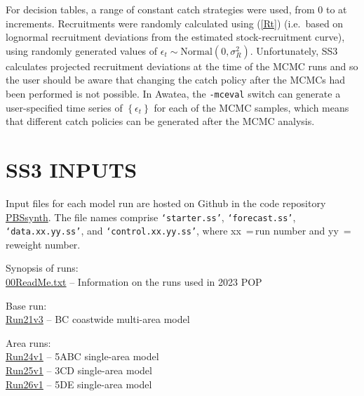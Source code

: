 \documentclass[11pt]{book}
\newcommand{\code}[1]{\normalsize\texttt{#1}\normalsize}%
\def\hsd{\hspace*{1ex}}
\def\tab{\hsd\hsd}
\newcommand{\eref}[1]{(\ref{#1})}
\begin{document}
For decision tables, a range of constant catch strategies were used, from 0 to \policyMax{} at \policyInc{} increments.
Recruitments were randomly calculated using \eref{Rt} (i.e.~based on lognormal recruitment deviations from the estimated stock-recruitment curve), using randomly generated values of $\epsilon_t \sim \mbox{Normal}(0, \sigma_R^2)$. 
Unfortunately, SS3 calculates projected recruitment deviations at the time of the MCMC runs and so the user should be aware that changing the catch policy after the MCMCs had been performed is not possible.
In Awatea, the \code{-mceval} switch can generate a user-specified time series of $\left\{ \epsilon_t \right\}$ for each of the MCMC samples, which means that different catch policies can be generated after the MCMC analysis.

\section{SS3 INPUTS} \label{s:inputs}

Input files for each model run are hosted on Github in the code repository \href{https://github.com/pbs-software/pbs-synth}{PBSsynth}.
The file names comprise \code{`starter.ss'}, \code{`forecast.ss'}, \code{`data.xx.yy.ss'}, and \code{`control.xx.yy.ss'}, where xx~=\,run number and yy~=\,reweight number. 

Synopsis of runs:\\
\tab \href{https://github.com/pbs-software/pbs-synth/tree/master/PBSsynth/inst/input/2023/POP/00ReadMe.txt}{00ReadMe.txt} -- Information on the runs used in 2023 POP

Base run:\\
\tab \href{https://github.com/pbs-software/pbs-synth/tree/master/PBSsynth/inst/input/2023/POP/CST/Base/R21v3/21.01}{Run21v3} -- BC coastwide multi-area model

Area runs:\\
\tab \href{https://github.com/pbs-software/pbs-synth/tree/master/PBSsynth/inst/input/2023/POP/5ABC/R24v1/24.01}{Run24v1} -- 5ABC single-area model\\
\tab \href{https://github.com/pbs-software/pbs-synth/tree/master/PBSsynth/inst/input/2023/POP/3CD/R25v1/25.01}{Run25v1} -- 3CD single-area model\\
\tab \href{https://github.com/pbs-software/pbs-synth/tree/master/PBSsynth/inst/input/2023/POP/5DE/R26v1/26.01}{Run26v1} -- 5DE single-area model
\end{document}
